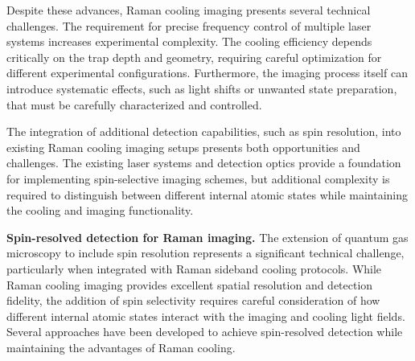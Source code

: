 Despite these advances, Raman cooling imaging presents several technical challenges. The requirement for precise frequency control of multiple laser systems increases experimental complexity. The cooling efficiency depends critically on the trap depth and geometry, requiring careful optimization for different experimental configurations. Furthermore, the imaging process itself can introduce systematic effects, such as light shifts or unwanted state preparation, that must be carefully characterized and controlled.

The integration of additional detection capabilities, such as spin resolution, into existing Raman cooling imaging setups presents both opportunities and challenges. The existing laser systems and detection optics provide a foundation for implementing spin-selective imaging schemes, but additional complexity is required to distinguish between different internal atomic states while maintaining the cooling and imaging functionality.




\textbf{Spin-resolved detection for Raman imaging.}
The extension of quantum gas microscopy to include spin resolution represents a significant technical challenge, particularly when integrated with Raman sideband cooling protocols. While Raman cooling imaging provides excellent spatial resolution and detection fidelity, the addition of spin selectivity requires careful consideration of how different internal atomic states interact with the imaging and cooling light fields. Several approaches have been developed to achieve spin-resolved detection while maintaining the advantages of Raman cooling.

